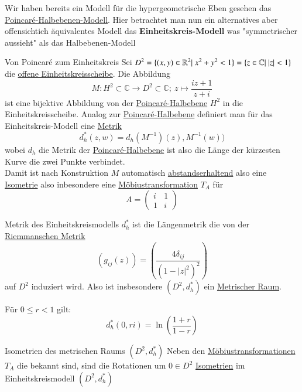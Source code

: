 Wir haben bereits ein Modell für die hypergeometrische Eben gesehen das \hyperref[hyperbolischpoincare]{Poincaré-Halbebenen-Modell}. Hier betrachtet man nun ein alternatives aber offensichtich äquivalentes Modell das \textbf{Einheitskreis-Modell} was "symmetrischer aussieht" als das Halbebenen-Modell

\begin{titleDef}{Von Poincaré zum Einheitskreis}
\label{hyperEinheitskreis}
Sei $D^2=\{(x,y)\in\Rtwo|\ x^2+y^2<1\}=\{z\in\mathbb{C}|\ \lvert z\rvert<1\}$ die \hyperref[einheitskreisscheibeoff]{offene Einheitskreisscheibe}. Die Abbildung
$$M:H^2\subset\mathbb{C}\to D^2\subset\mathbb{C};\: z\mapsto\frac{iz+1}{z+i}$$
ist eine bijektive Abbildung von der \hyperref[hyperbolischpoincare]{Poincaré-Halbebene} $H^2$ in die Einheitskreisscheibe.
\label{einheitskreismetrik}
Analog zur \hyperref[hyperbolischpoincare]{Poincaré-Halbebene} definiert man für das Einheitskreis-Modell eine \hyperref[hyperToMetrisch]{Metrik} 
$$d_h^*(z,w)=d_h(M^{-1})(z),M^{-1}(w))$$
wobei $d_h$ die Metrik der \hyperref[hyperbolischpoincare]{Poincaré-Halbebene} ist also die Länge der kürzesten Kurve die zwei Punkte verbindet.\\
Damit ist nach Konstruktion $M$ automatisch \hyperref[abstandserhaltend]{abstandserhaltend} also eine \hyperref[Isometrie]{Isometrie} also inbesondere eine \hyperref[moebiustrans]{Möbiustransformation} $T_A$ für
$$A=\begin{pmatrix}
	i&1\\1&i
\end{pmatrix}$$
\end{titleDef}

\begin{titleDef}{Metrik des Einheitskreismodells}
\label{metrikEinheitskreis}
$d_h^*$ ist die Längenmetrik die von der \hyperref[riemannMetrik]{Riemmanschen Metrik}
$$(g_{ij}(z))=\left(\frac{4\delta_{ij}}{(1-\lvert z\rvert^2)^2}\right)$$
auf $D^2$ induziert wird. Also ist insbesondere $(D^2,d_h^*)$ ein \hyperref[MetrischerRaum]{Metrischer Raum}.\par
Für $0\leq r<1$ gilt:
$$d_h^*(0,ri)=\ln\left(\frac{1+r}{1-r}\right)$$
\end{titleDef}

\begin{titleDef}{Isometrien des metrischen Raums $(D^2,d_h^*)$}
Neben den \hyperref[moebiustrans]{Möbiustransformationen} $T_A$ die bekannt sind, sind die Rotationen um $0\in D^2$ \hyperref[Isometrie]{Isometrien} im Einheitskreismodell $(D^2,d_h^*)$
\end{titleDef}

